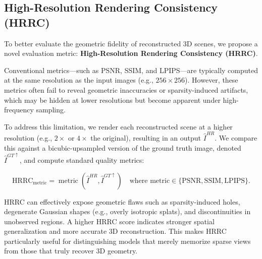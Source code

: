 \subsection{High-Resolution Rendering Consistency (HRRC)}

To better evaluate the geometric fidelity of reconstructed 3D scenes,
we propose a novel evaluation metric: \textbf{High-Resolution Rendering Consistency (HRRC)}.

Conventional metrics—such as PSNR, SSIM, and LPIPS—are typically computed at the same resolution as the input images (e.g., $256 \times 256$). However, these metrics often fail to reveal geometric inaccuracies or sparsity-induced artifacts, which may be hidden at lower resolutions but become apparent under high-frequency sampling.

To address this limitation, we render each reconstructed scene at a higher resolution (e.g., $2\times$ or $4\times$ the original), resulting in an output $\hat{I}^{HR}$. We compare this against a bicubic-upsampled version of the ground truth image, denoted $\hat{I}^{GT\uparrow}$, and compute standard quality metrics:

\begin{equation}
\mathrm{HRRC}_{\text{metric}} = \operatorname{metric}(\hat{I}^{HR}, \hat{I}^{GT\uparrow}) \quad \text{where metric} \in \{\mathrm{PSNR}, \mathrm{SSIM}, \mathrm{LPIPS}\}.
\end{equation}

HRRC can effectively expose geometric flaws such as sparsity-induced holes, degenerate Gaussian shapes (e.g., overly isotropic splats), and discontinuities in unobserved regions. A higher HRRC score indicates stronger spatial generalization and more accurate 3D reconstruction. This makes HRRC particularly useful for distinguishing models that merely memorize sparse views from those that truly recover 3D geometry.